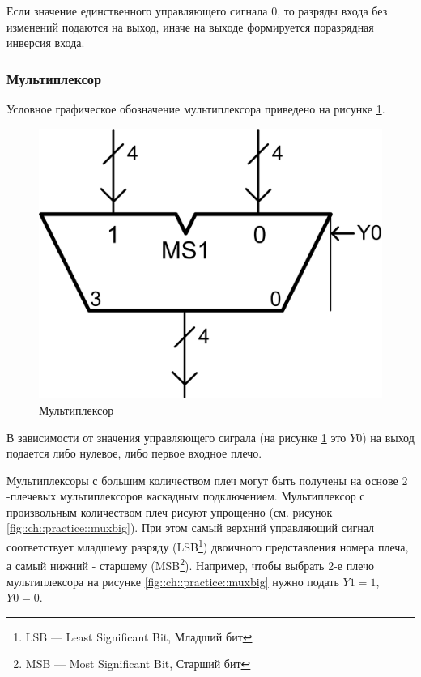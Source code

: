 Если значение единственного управляющего сигнала 0, то разряды входа без изменений подаются на выход, иначе на выходе формируется поразрядная инверсия входа.

\subsubsection{Мультиплексор}

Условное графическое обозначение мультиплексора приведено на рисунке \ref{fig::ch::practice::mux}.
\begin{figure}[!ht]
    \centering
    \includegraphics{fig/mux}
    \caption{Мультиплексор}
    \label{fig::ch::practice::mux}
\end{figure}

В зависимости от значения управляющего сиграла (на рисунке \ref{fig::ch::practice::mux} это $Y0$) на выход подается либо нулевое, либо первое входное плечо.

Мультиплексоры с большим количеством плеч могут быть получены на основе $2$-плечевых мультиплексоров каскадным подключением. Мультиплексор с произвольным количеством плеч рисуют упрощенно (см. рисунок \ref{fig::ch::practice::muxbig}). При этом самый верхний управляющий сигнал соответствует младшему разряду (LSB\footnote{LSB --- Least Significant Bit, Младший бит}) двоичного представления номера плеча, а самый нижний - старшему (MSB\footnote{MSB --- Most Significant Bit, Старший бит}). Например, чтобы выбрать 2-е плечо мультиплексора на рисунке \ref{fig::ch::practice::muxbig} нужно подать $Y1=1$, $Y0=0$.

